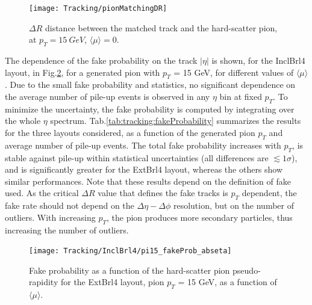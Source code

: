 \documentclass[a4paper,twoside,12pt]{book}
\begin{document}
\begin{figure}
\centering
\texttt{[image: Tracking/pionMatchingDR]}
\caption{$\Delta R$ distance between the matched track and the hard-scatter pion, at $p_{T} = 15\ GeV$, $\langle\mu\rangle = 0$.} 
\label{fig:tracking:pionMatchingDR}
\end{figure}

The dependence of the fake probability on the track $|\eta|$ is shown, for the InclBrl4 layout, in Fig.\ref{fig:tracking:fakeProbability}, for a generated pion with $p_{T}$ = 15 GeV, for 
different values of $\langle\mu\rangle$. Due to the small fake probability and statistics, no significant dependence on the average number of pile-up events is observed in any $\eta$ bin at fixed $p_{T}$. To minimize
the uncertainty, the fake probability is computed by integrating over the whole $\eta$ spectrum. Tab.\ref{tab:tracking:fakeProbability} summarizes the results for the three layouts considered, as a function of the generated pion $p_{T}$ and average number of pile-up events. The total fake probability increases with $p_{T}$, is stable against pile-up within
statistical uncertainties (all differences are $\lesssim 1 \sigma$), and is significantly
greater for the ExtBrl4 layout, whereas the others show similar performances. Note that 
these results depend on the definition of fake used. As the critical $\Delta R$ value that defines
the fake tracks is $p_{T}$ dependent, the fake rate should not depend on the $\Delta\eta-\Delta\phi$ resolution, but on the number of outliers. With increasing $p_{T}$, 
the pion produces more secondary particles, thus increasing the number of outliers.\\ 

\begin{figure}
\centering
\texttt{[image: Tracking/InclBrl4/pi15\_fakeProb\_abseta]}
\caption{Fake probability as a function of the hard-scatter pion pseudo-rapidity for the ExtBrl4 layout, pion $p_{T}$ = 15 GeV, as a function of $\langle\mu\rangle$.} 
\label{fig:tracking:fakeProbability}
\end{figure}
\end{document}
